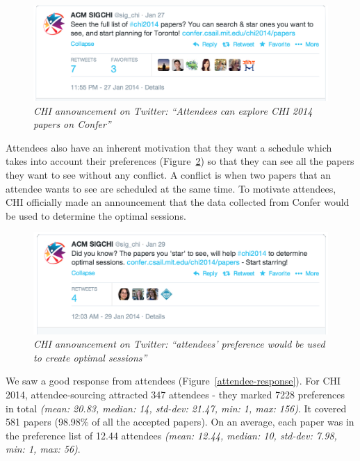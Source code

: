 \documentclass[letterpaper]{article}
\begin{document}
\begin{enumerate}[I]
\begin{figure}[!h]
\centering
\includegraphics[width=0.9\columnwidth]{chi-announcement-2.png}
\caption{\emph{CHI announcement on Twitter: ``Attendees can explore CHI 2014 papers on Confer''}}
\label{chi-announcement-2}
\end{figure}

Attendees also have an inherent motivation that they want a schedule which takes into account their preferences (Figure~\ref{chi-announcement-1}) so that they can see all the papers they want to see without any conflict. A conflict is when two papers that an attendee wants to see are scheduled at the same time. To motivate attendees, CHI officially made an announcement that the data collected from Confer would be used to determine the optimal sessions.
 

\begin{figure}[!h]
\centering
\includegraphics[width=0.9\columnwidth]{chi-announcement-1.png}
\caption{\emph{CHI announcement on Twitter: ``attendees' preference would be used to create optimal sessions''}}
\label{chi-announcement-1}
\end{figure}

We saw a good response from attendees (Figure~\ref{attendee-response}). For CHI 2014, attendee-sourcing attracted 347 attendees - they marked 7228 preferences in total \emph{(mean: 20.83, median: 14, std-dev: 21.47, min: 1, max: 156)}. It covered 581 papers (98.98\% of all the accepted papers). On an average, each paper was in the preference list of 12.44 attendees \emph{(mean: 12.44, median: 10, std-dev: 7.98, min: 1, max: 56)}.



\end{enumerate}
\end{document}
